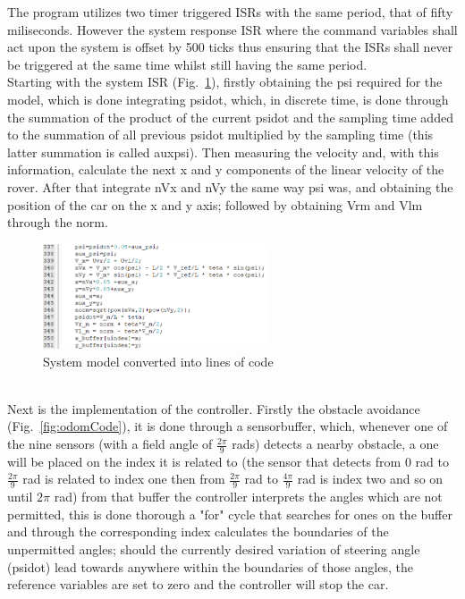The program utilizes two timer triggered ISRs with the same period, that of fifty miliseconds. However the system response ISR where the command variables shall act upon the system is offset by 500 ticks thus ensuring that the ISRs shall never be triggered at the same time whilst still having the same period. \\
Starting with the system ISR (Fig.~\ref{fig:kinModeCode}), firstly obtaining the psi required for the model, which is done integrating psidot, which, in discrete time, is done through the summation of the product of the current psidot and the sampling time added to the summation of all previous psidot multiplied by the sampling time (this latter summation is called aux\textunderscore psi). Then measuring the velocity and, with this information, calculate the next x and y components of the linear velocity of the rover. After that integrate nVx and nVy the same way psi was, and obtaining the position of the car on the x and y axis; followed by obtaining Vr\textunderscore m and Vl\textunderscore m through the norm.
\begin{figure}[!htbp]
\centering
       \includegraphics[page=1,width=0.6\textwidth]{img/sysCode.png} 
\caption{System model converted into lines of code}
\label{fig:kinModeCode}
\end{figure}
\\
Next is the implementation of the controller. Firstly the obstacle avoidance (Fig.~\ref{fig:odomCode}), it is done through a sensor\textunderscore buffer, which, whenever one of the nine sensors (with a field angle of $\frac{2\pi}{9}$ rads) detects a nearby obstacle, a one will be placed on the index it is related to (the sensor that detects from 0 rad to  $\frac{2\pi}{9}$ rad is related to index one then from $\frac{2\pi}{9}$ rad to $\frac{4\pi}{9}$ rad is index two and so on until $2\pi$ rad) from that buffer the controller interprets the angles which are not permitted, this is done thorough a "for" cycle that searches for ones on the buffer and through the corresponding index calculates the boundaries of the unpermitted angles; should the currently desired variation of steering angle (psidot) lead towards anywhere within the boundaries of those angles, the reference variables are set to zero and the controller will stop the car.
